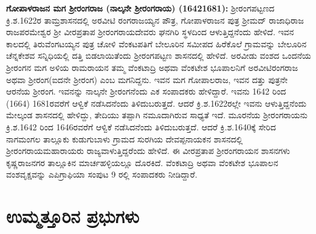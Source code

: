 \textbf{ಗೋಪಾಳರಾಜನ ಮಗ ಶ‍್ರೀರಂಗರಾಜ (ನಾಲ್ಕನೇ ಶ‍್ರೀರಂಗರಾಯ) (1642\general{\enginline{-}}1681): } ಶ‍್ರೀರಂಗಪಟ್ಟಣದ ಕ್ರಿ.ಶ.1622ರ ತಾಮ್ರಶಾಸನದಲ್ಲಿ ಅರವೀಟಿ ರಂಗರಾಜಯ್ಯನ ಪೌತ್ರ, ಗೋಪಾಳರಾಜನ ಪುತ್ರ ಶ‍್ರೀಮದ್​ ರಾಜಾಧಿರಾಜ ರಾಜಪರಮೇಶ್ವರ ಶ‍್ರೀ ವೀರಪ್ರತಾಪ ಶ‍್ರೀರಂಗರಾಯದೇವರು ಘನಗಿರಿ ಸ್ಥಳದಿಂದ ಆಳುತ್ತಿದ್ದನೆಂದು ಹೇಳಿದೆ. ಇವನ ಕಾಲದಲ್ಲಿ ತಿರುವೆಂಗಟಯ್ಯನ ಪುತ್ರ ಚೋಳಿ ವೆಂಕಟಪತಿಗೆ ಬೇಲೂರಿನ ಸಮೀಪದ ಹಿರೆಕೊಲೆ ಗ್ರಾಮವನ್ನು ಬೇಲೂರಿನ ಚೆನ್ನಕೇಶವ ಸನ್ನಿಧಿಯಲ್ಲಿ ದತ್ತಿ ಬಿಡಲಾಯಿತೆಂದು ಶ‍್ರೀರಂಗಪಟ್ಟಣ ಶಾಸನದಲ್ಲಿ ಹೇಳಿದೆ. ಅರವೀಡು ವಂಶದ ಒಂದನೆಯ ಶ‍್ರೀರಂಗನ ಮಗ ಅಳಿಯ ರಾಮರಾಯನ ತಮ್ಮ ವೆಂಕಟಾದ್ರಿ ಅಥವಾ ವೆಂಕಟೇಶ ಭೂಪಾಲನಿಗೆ ಅರವೀಟಿರಂಗರಾಜ ಅಥವಾ ಶ‍್ರೀರಂಗ(ಐದನೇ ಶ‍್ರೀರಂಗ) ಎಂಬ ಮಗನಿದ್ದನು. ಇವನ ಮಗ ಗೋಪಾಲರಾಜ, ಇವನ ದತ್ತು ಪುತ್ರನೇ ಆರನೆಯ ಶ‍್ರೀರಂಗ. ಇವನನ್ನು ನಾಲ್ಕನೇ ಶ‍್ರೀರಂಗನೆಂದು ಎಕ ಸಂಪಾದಕರು ಹೇಳಿದ್ದಾರೆ. ಇವನು 1642 ರಿಂದ (1664) 1681ರವರೆಗೆ ಆಳ್ವಿಕೆ ನಡೆಸಿದನೆಂದು ತಿಳಿದುಬರುತ್ತದೆ. ಆದರೆ ಕ್ರಿ.ಶ.1622ರಲ್ಲೇ ಇವನು ಆಳುತ್ತಿದ್ದನೆಂದು ಮೇಲ್ಕಂಡ ಶಾಸನದಲ್ಲಿ ಹೇಳಿದ್ದು, ತೇದಿಯು ತಪ್ಪಾಗಿ ನಮೂದಾಗಿರುವ ಸಾಧ್ಯತೆ ಇದೆ. ಮೂರನೆಯ ಶ‍್ರೀರಂಗರಾಯನು ಕ್ರಿ.ಶ.1642 ರಿಂದ 1646ರವರೆಗೆ ಆಳ್ವಿಕೆ ನಡೆಸಿದನೆಂದು ತಿಳಿದುಬರುತ್ತದೆ. ಆದರೆ ಕ್ರಿ.ಶ.1640ಕ್ಕೆ ಸೇರಿದ ನಾಗಮಂಗಲ ತಾಲ್ಲೂಕು ಕುಡುಗುಬಾಳು ಗ್ರಾಮದ ಸುರಗಿಯ ದೇವಪ್ಪನಾಯಕನ ಶಾಸನದಲ್ಲಿ ಶ‍್ರೀರಂಗರಾಯಮಹಾರಾಯರು ರಾಜ್ಯವಾಳುತ್ತಿದ್ದರೆಂದು ಹೇಳಿದೆ. ಈ ವೀರಪ್ರತಾಪ ಶ‍್ರೀರಂಗರಾಯನ ಶಾಸನಗಳು ಕೃಷ್ಣರಾಜನಗರ ತಾಲ್ಲೂಕಿನ ಮಾರ್ಚಹಳ್ಳಿಯಲ್ಲೂ ದೊರಕಿದೆ. ವೆಂಕಟಾದ್ರಿ ಅಥವಾ ವೆಂಕಟೇಶ ಭೂಪಾಲನ ವಂಶವೃಕ್ಷವನ್ನು ಎಪಿಗ್ರಾಫಿಯಾ ಸಂಪುಟ 9 ರಲ್ಲಿ ಸಂಪಾದಕರು ನೀಡಿದ್ದಾರೆ.


\section*{ಉಮ್ಮತ್ತೂರಿನ ಪ್ರಭುಗಳು}

